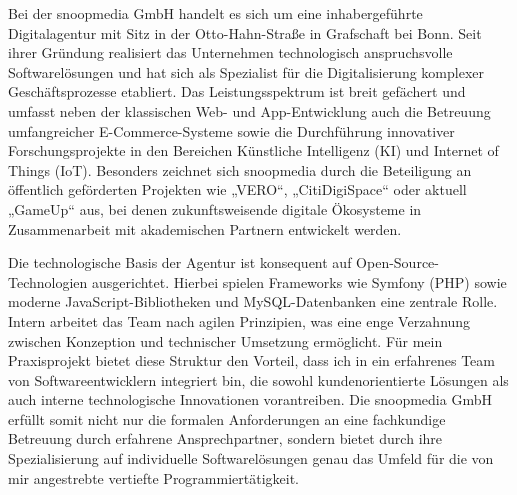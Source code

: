 Bei der snoopmedia GmbH handelt es sich um eine inhabergeführte Digitalagentur mit Sitz in der Otto-Hahn-Straße in Grafschaft bei Bonn. Seit ihrer Gründung realisiert das Unternehmen 
technologisch anspruchsvolle Softwarelösungen und hat sich als Spezialist für die Digitalisierung komplexer Geschäftsprozesse etabliert. Das Leistungsspektrum ist breit gefächert und 
umfasst neben der klassischen Web- und App-Entwicklung auch die Betreuung umfangreicher E-Commerce-Systeme sowie die Durchführung innovativer Forschungsprojekte in den Bereichen 
Künstliche Intelligenz (KI) und Internet of Things (IoT). Besonders zeichnet sich snoopmedia durch die Beteiligung an öffentlich geförderten Projekten wie „VERO“, „CitiDigiSpace“ 
oder aktuell „GameUp“ aus, bei denen zukunftsweisende digitale Ökosysteme in Zusammenarbeit mit akademischen Partnern entwickelt werden.

Die technologische Basis der Agentur ist konsequent auf Open-Source-Technologien ausgerichtet. Hierbei spielen Frameworks wie Symfony (PHP) sowie moderne JavaScript-Bibliotheken 
und MySQL-Datenbanken eine zentrale Rolle. Intern arbeitet das Team nach agilen Prinzipien, was eine enge Verzahnung zwischen Konzeption und technischer Umsetzung ermöglicht. Für 
mein Praxisprojekt bietet diese Struktur den Vorteil, dass ich in ein erfahrenes Team von Softwareentwicklern integriert bin, die sowohl kundenorientierte Lösungen als auch interne 
technologische Innovationen vorantreiben. Die snoopmedia GmbH erfüllt somit nicht nur die formalen Anforderungen an eine fachkundige Betreuung durch erfahrene Ansprechpartner, sondern 
bietet durch ihre Spezialisierung auf individuelle Softwarelösungen genau das Umfeld für die von mir angestrebte vertiefte Programmiertätigkeit.